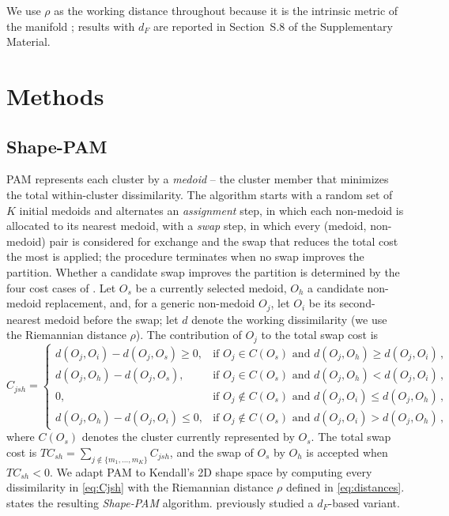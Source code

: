 \documentclass[review,11pt,3p,authoryear]{elsarticle}
\begin{document}
We use $\rho$ as the working distance throughout because it is the
intrinsic metric of the manifold \citep{le1993riemannian,vinue2016means};
results with $d_F$ are reported in Section~S.8 of the Supplementary Material.




\section{Methods}
\label{sec:methods}

\subsection{Shape-PAM}
\label{subsec:pam-shape}

PAM \citep{rousseeuw1990finding} represents each cluster by a
\emph{medoid} -- the cluster member that minimizes the total
within-cluster dissimilarity. The algorithm starts with a random set
of $K$ initial medoids and alternates an \emph{assignment} step, in
which each non-medoid is allocated to its nearest medoid, with a
\emph{swap} step, in which every (medoid, non-medoid) pair is
considered for exchange and the swap that reduces the total cost the
most is applied; the procedure terminates when no swap improves the
partition. Whether a candidate swap improves the partition is
determined by the four cost cases of \citet{ng2002clarans}. Let $O_s$
be a currently selected medoid, $O_h$ a candidate non-medoid
replacement, and, for a generic non-medoid $O_j$, let $O_i$ be its
second-nearest medoid before the swap; let $d$ denote the working
dissimilarity (we use the Riemannian distance $\rho$). The
contribution of $O_j$ to the total swap cost is
\begin{equation}
  \label{eq:Cjsh}
  C_{jsh} =
  \begin{cases}
    d(O_j,O_i) - d(O_j,O_s) \ge 0, &
      \text{if } O_j\in C(O_s)\text{ and }d(O_j,O_h)\ge d(O_j,O_i)\,, \\
    d(O_j,O_h) - d(O_j,O_s),       &
      \text{if } O_j\in C(O_s)\text{ and }d(O_j,O_h)< d(O_j,O_i)\,, \\
    0,                              &
      \text{if } O_j\notin C(O_s)\text{ and }d(O_j,O_i)\le d(O_j,O_h)\,, \\
    d(O_j,O_h) - d(O_j,O_i)\le 0,  &
      \text{if } O_j\notin C(O_s)\text{ and }d(O_j,O_i)> d(O_j,O_h)\,,
  \end{cases}
\end{equation}
where $C(O_s)$ denotes the cluster currently represented by $O_s$. The
total swap cost is
$TC_{sh} = \sum_{j\notin\{m_1,\ldots,m_K\}} C_{jsh}$, and the swap of
$O_s$ by $O_h$ is accepted when $TC_{sh}<0$. We adapt PAM to Kendall's
2D shape space by computing every dissimilarity in \eqref{eq:Cjsh} with
the Riemannian distance $\rho$ defined in \eqref{eq:distances}.
 states the resulting \emph{Shape-PAM} algorithm.
\citet{gomes2020} previously studied a $d_F$-based variant.
\end{document}
